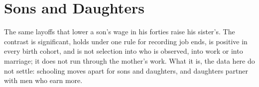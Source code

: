 \section{Sons and Daughters}\label{sec:daughters}

The same layoffs that lower a son's wage in his forties raise his sister's. The contrast is significant, holds under one
rule for recording job ends, is positive in every birth cohort, and is not selection into who is observed, into work
or into marriage; it does not run through the mother's work. What it is, the data here do not settle: schooling moves
apart for sons and daughters, and daughters partner with men who earn more.


